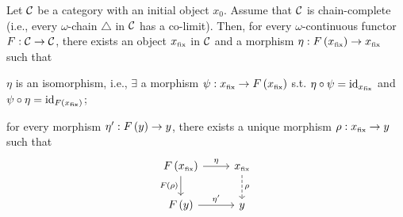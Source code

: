 \begin{theorem}
	Let $\mathcal{C}$ be a category with an initial object $x_0$.
	Assume that $\mathcal{C}$ is chain-complete (i.e., every $\omega$-chain $\triangle$ in
	$\mathcal{C}$ has a co-limit).
	Then, for every $\omega$-continuous functor $F: \mathcal{C} \to \mathcal{C}$, there exists an
	object $x_{\textrm{\tiny fix}}$ in $\mathcal{C}$ and a morphism $\eta:
		F\left( x_{\textrm{\tiny fix}} \right) \to x_{\textrm{\tiny fix}}$ such that
	\begin{enumrm}
		\item
		$\eta$ is an isomorphism, i.e.,
		$\exists$ a morphism $\psi : x_{\textrm{\tiny fix}} \to F\left( x_{\textrm{\tiny fix}} \right)$ s.t.
		$\eta \circ \psi = \textrm{id}_{x_{\textrm{\tiny fix}}}$ and $\psi \circ \eta = \textrm{id}_{F\left( x_{\textrm{\tiny fix}} \right)}$;
		\item
		for every morphism $\eta': F\left( y \right) \to y$, there exists a unique morphism
		$\rho: x_{\textrm{\tiny fix}} \to y$ such that
		\[
			\begin{tikzcd}
				F\prths{\subsctext{x}{fix}} \arrow[r, "\eta"] \arrow[d, swap, "F\prths{\rho}"] & \subsctext{x}{fix} \arrow[d, dashed, "\rho"] \\
				F\prths{y} \arrow[r, "\eta'"] & y
			\end{tikzcd}
		\]
	\end{enumrm}
\end{theorem}
%
